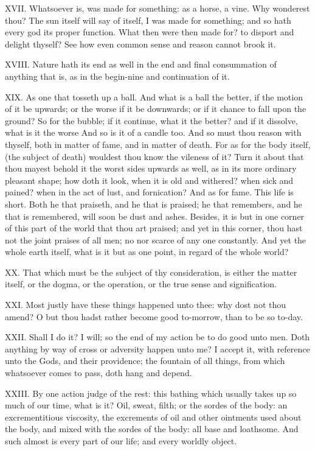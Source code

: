 XVII. Whatsoever is, was made for something: as a horse, a vine. Why
wonderest thou? The sun itself will say of itself, I was made for
something; and so hath every god its proper function. What then were then
made for? to disport and delight thyself? See how even common sense and
reason cannot brook it.

XVIII. Nature hath its end as well in the end and final consummation of
anything that is, as in the begin-nine and continuation of it.

XIX. As one that tosseth up a ball. And what is a ball the better, if
the motion of it be upwards; or the worse if it be downwards; or if it
chance to fall upon the ground? So for the bubble; if it continue, what it
the better? and if it dissolve, what is it the worse And so is it of a
candle too. And so must thou reason with thyself, both in matter of fame,
and in matter of death. For as for the body itself, (the subject of death)
wouldest thou know the vileness of it? Turn it about that thou mayest
behold it the worst sides upwards as well, as in its more ordinary
pleasant shape; how doth it look, when it is old and withered? when sick
and pained? when in the act of lust, and fornication? And as for fame.
This life is short. Both he that praiseth, and he that is praised; he that
remembers, and he that is remembered, will soon be dust and ashes.
Besides, it is but in one corner of this part of the world that thou art
praised; and yet in this corner, thou hast not the joint praises of all
men; no nor scarce of any one constantly. And yet the whole earth itself,
what is it but as one point, in regard of the whole world?

XX. That which must be the subject of thy consideration, is either the
matter itself, or the dogma, or the operation, or the true sense and
signification.

XXI. Most justly have these things happened unto thee: why dost not
thou amend? O but thou hadst rather become good to-morrow, than to be so
to-day.

XXII. Shall I do it? I will; so the end of my action be to do good unto
men. Doth anything by way of cross or adversity happen unto me? I accept
it, with reference unto the Gods, and their providence; the fountain of
all things, from which whatsoever comes to pass, doth hang and depend.

XXIII. By one action judge of the rest: this bathing which usually takes
up so much of our time, what is it? Oil, sweat, filth; or the sordes of
the body: an excrementitious viscosity, the excrements of oil and other
ointments used about the body, and mixed with the sordes of the body: all
base and loathsome. And such almost is every part of our life; and every
worldly object.

